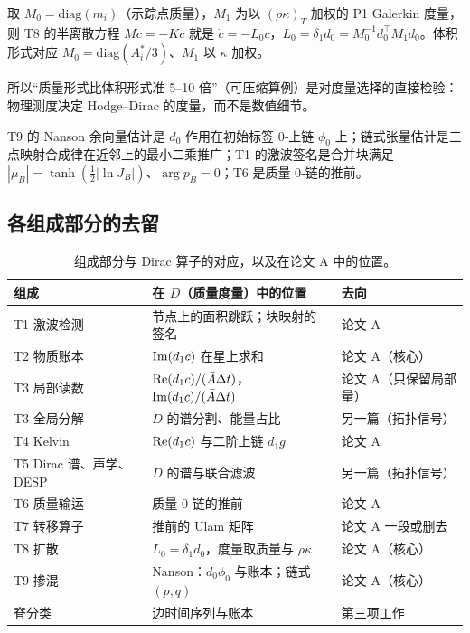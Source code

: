 \begin{proposition}\label{pB:prop:L0}
取 $M_0=\mathrm{diag}(m_i)$（示踪点质量），$M_1$ 为以 $(\rho\kappa)_T$ 加权的 P1 Galerkin 度量，则 T8 的半离散方程 $M\dot c=-Kc$ 就是 $\dot c=-L_0c$，$L_0=\delta_1d_0=M_0^{-1}d_0^\top M_1d_0$。体积形式对应 $M_0=\mathrm{diag}(A^\ast_i/3)$、$M_1$ 以 $\kappa$ 加权。
\end{proposition}
所以“质量形式比体积形式准 5–10 倍”（可压缩算例）是对度量选择的直接检验：物理测度决定 Hodge–Dirac 的度量，而不是数值细节。

\begin{proposition}[其余组成的位置]
T9 的 Nanson 余向量估计是 $d_0$ 作用在初始标签 0‑上链 $\phi_0$ 上；链式张量估计是三点映射合成律在近邻上的最小二乘推广；T1 的激波签名是合并块满足 $|\mu_B|=\tanh(\tfrac12|\ln J_B|)$、$\arg p_B=0$；T6 是质量 0‑链的推前。
\end{proposition}

\subsection{各组成部分的去留}
\begin{table}[!htbp]\centering\small
\caption{组成部分与 Dirac 算子的对应，以及在论文 A 中的位置。}
\begin{tabularx}{\linewidth}{@{}l L l@{}}\toprule
组成 & 在 $D$（质量度量）中的位置 & 去向\\\midrule
T1 激波检测 & 节点上的面积跳跃；块映射的签名 & 论文 A\\
T2 物质账本 & $\operatorname{Im}(d_1c)$ 在星上求和 & 论文 A（核心）\\
T3 局部读数 & $\operatorname{Re}(d_1c)/(\bar A\Delta t)$，$\operatorname{Im}(d_1c)/(\bar A\Delta t)$ & 论文 A（只保留局部量）\\
T3 全局分解 & $D$ 的谱分割、能量占比 & 另一篇（拓扑信号）\\
T4 Kelvin & $\operatorname{Re}(d_1c)$ 与二阶上链 $d_1g$ & 论文 A\\
T5 Dirac 谱、声学、DESP & $D$ 的谱与联合滤波 & 另一篇（拓扑信号）\\
T6 质量输运 & 质量 0‑链的推前 & 论文 A\\
T7 转移算子 & 推前的 Ulam 矩阵 & 论文 A 一段或删去\\
T8 扩散 & $L_0=\delta_1d_0$，度量取质量与 $\rho\kappa$ & 论文 A（核心）\\
T9 掺混 & Nanson：$d_0\phi_0$ 与账本；链式 $(p,q)$ & 论文 A（核心）\\
脊分类 & 边时间序列与账本 & 第三项工作\\\bottomrule
\end{tabularx}\end{table}

